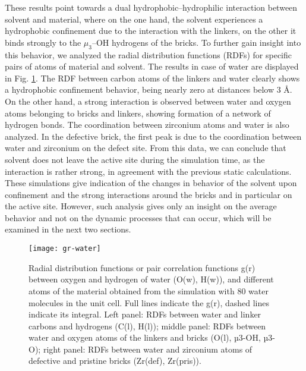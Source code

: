 These results point towards a dual hydrophobic--hydrophilic interaction between solvent and material, where on the one hand, the solvent experiences a hydrophobic confinement due to the interaction with the linkers, on the other it binds strongly to the $\mu_3$--OH hydrogens of the bricks. To further gain insight into this behavior, we analyzed the radial distribution functions (RDFs) for specific pairs of atoms of material and solvent. The results in case of water are displayed in Fig. \ref{fig:gr-water}. The RDF between carbon atoms of the linkers and water clearly shows a hydrophobic  confinement behavior, being nearly zero at distances below 3 \AA. On the other hand, a strong interaction is observed between water and oxygen atoms belonging to bricks and linkers, showing formation of a network of hydrogen bonds. The coordination between zirconium atoms and water is also analyzed. In the defective brick, the first peak is due to the coordination between water and zirconium on the defect site. From this data, we can conclude that solvent does not leave the active site during the simulation time, as the interaction is rather strong, in agreement with the previous static calculations. These simulations give indication of the changes in behavior of the solvent upon confinement and the strong interactions around the bricks and in particular on the active site. However, such analysis gives only an insight on the average behavior and not on the dynamic processes that can occur, which will be examined in the next two sections. 

\begin{figure}[!htbp]
	\centering
	\texttt{[image: gr-water]}
	\caption{Radial distribution functions or pair correlation functions g(r) between oxygen and hydrogen of water (O(w), H(w)), and different atoms of the material obtained from the simulation with 80 water molecules in the unit cell. Full lines indicate the g(r), dashed lines indicate its integral. Left panel: RDFs between water and linker carbons and hydrogens (C(l), H(l)); middle panel: RDFs between water and oxygen atoms of the linkers and bricks (O(l), µ3-OH, µ3-O); right panel: RDFs between water and zirconium atoms of defective and pristine bricks (Zr(def), Zr(pris)). }
	\label{fig:gr-water}
\end{figure}



